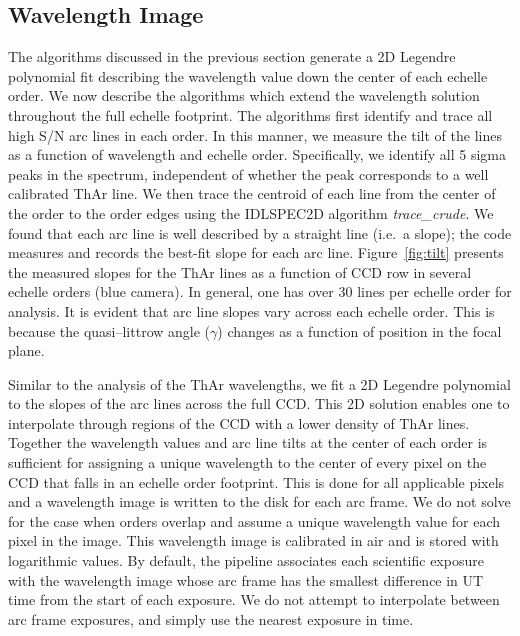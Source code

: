 \documentclass[12pt,preprint]{aastex}
\begin{document}
\subsection{Wavelength Image}
\label{sec:arcimg}

The algorithms discussed in the previous section 
generate a 2D Legendre polynomial fit describing the 
wavelength value down the center of each echelle order.
We now describe the algorithms which extend the wavelength
solution throughout the full echelle footprint.
The algorithms first identify and trace all high S/N arc
lines in each order.  In this manner, we measure the tilt
of the lines as a function of wavelength and echelle order.
Specifically, we identify all 5 sigma peaks in the spectrum,
independent of whether the peak corresponds to a well
calibrated ThAr line.  We then trace the centroid of each
line from the center of the order to the order edges
using the IDLSPEC2D algorithm {\it trace\_crude}.
We found that each arc line is well described by a straight line
(i.e.\ a slope); the code measures and records the best-fit slope
for each arc line.   
Figure~\ref{fig:tilt} presents the measured slopes 
for the ThAr lines 
as a function of CCD row 
in several echelle orders (blue camera).
In general, one has over 30 lines per echelle order for analysis.  
It is evident that arc line slopes vary across each echelle order.  
This is because the quasi--littrow angle ($\gamma$) changes as a function
of position in the focal plane.

Similar to the analysis of the ThAr wavelengths,
we fit a 2D Legendre polynomial
to the slopes of the arc lines across the full CCD.
This 2D solution enables one to 
interpolate through regions of the CCD with a lower density of 
ThAr lines.
Together the wavelength values and arc line tilts
at the center of each order is sufficient 
for assigning a unique wavelength to the center of every pixel
on the CCD that falls in an echelle order footprint.
This is done for all applicable pixels and
a wavelength image is written to the disk for each arc frame.
We do not solve for the case when orders overlap and assume a
unique wavelength value for each pixel in the image.
This wavelength image is calibrated in air and is stored with 
logarithmic values.
By default, the pipeline associates each scientific exposure with
the wavelength image whose arc frame has the smallest difference
in UT time from the start of each exposure.  We do not attempt to interpolate
between arc frame exposures, and simply use the nearest exposure in time.
\end{document}
